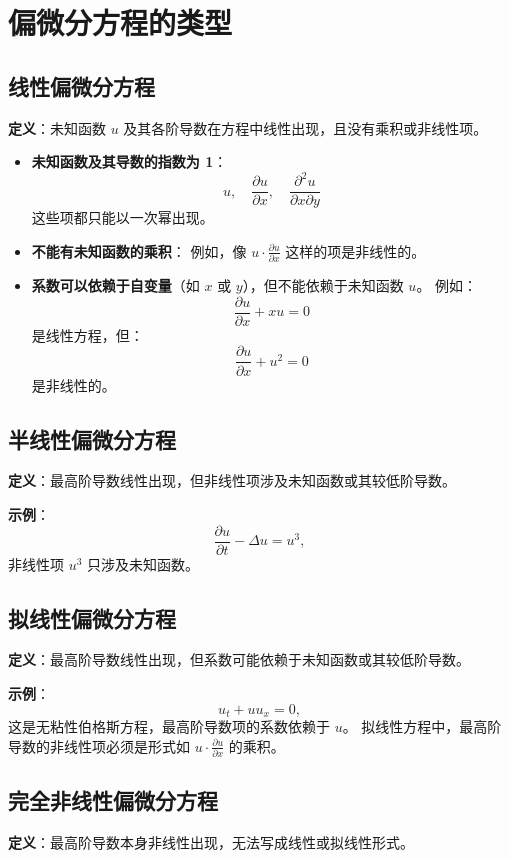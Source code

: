 \section{偏微分方程的类型}

\subsection{线性偏微分方程}
\textbf{定义}：未知函数 \(u\) 及其各阶导数在方程中线性出现，且没有乘积或非线性项。  

\begin{itemize}
    \item \textbf{未知函数及其导数的指数为 1}：
    \[
    u, \quad \frac{\partial u}{\partial x}, \quad \frac{\partial^2 u}{\partial x \partial y}
    \]
    这些项都只能以一次幂出现。

    \item \textbf{不能有未知函数的乘积}：  
    例如，像 \(u \cdot \frac{\partial u}{\partial x}\) 这样的项是非线性的。

    \item \textbf{系数可以依赖于自变量}（如 \(x\) 或 \(y\)），但不能依赖于未知函数 \(u\)。  
    例如：
    \[
    \frac{\partial u}{\partial x} + x u = 0
    \]
    是线性方程，但：
    \[
    \frac{\partial u}{\partial x} + u^2 = 0
    \]
    是非线性的。
\end{itemize}

\subsection{半线性偏微分方程}
\textbf{定义}：最高阶导数线性出现，但非线性项涉及未知函数或其较低阶导数。

\textbf{示例}：
\begin{equation}
\frac{\partial u}{\partial t} - \Delta u = u^3,
\end{equation}
非线性项 \(u^3\) 只涉及未知函数。

\subsection{拟线性偏微分方程}
\textbf{定义}：最高阶导数线性出现，但系数可能依赖于未知函数或其较低阶导数。

\textbf{示例}：
\begin{equation}
u_t + u u_x = 0,
\end{equation}
这是无粘性伯格斯方程，最高阶导数项的系数依赖于 \(u\)。  
拟线性方程中，最高阶导数的非线性项必须是形式如 \(u \cdot \frac{\partial u}{\partial x}\) 的乘积。

\subsection{完全非线性偏微分方程}
\textbf{定义}：最高阶导数本身非线性出现，无法写成线性或拟线性形式。
